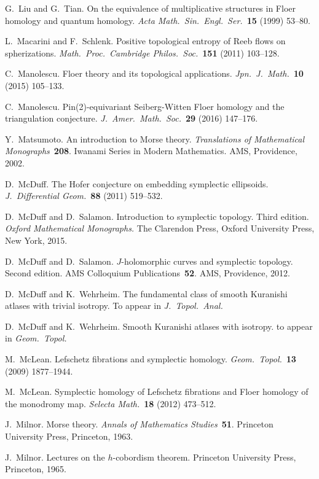 \documentclass[12pt,twoside]{amsart}
\theoremstyle{plain}
\numberwithin{figure}{section}
\numberwithin{equation}{section}
\begin{document}
\begin{thebibliography}{999}
G.\ Liu and G.\ Tian. 
On the equivalence of multiplicative structures in Floer homology and quantum homology. 
{\it Acta Math.\ Sin.\ Engl.\ Ser.}~{\bf 15} (1999) 53--80.

L.\ Macarini and F.\ Schlenk. 
Positive topological entropy of Reeb flows on spherizations. 
{\it Math.\ Proc.\ Cambridge Philos.\ Soc.}~{\bf 151} (2011) 103--128.

C.\ Manolescu.
Floer theory and its topological applications. 
{\it Jpn.\ J.\ Math.}~{\bf 10} (2015) 105--133.

C.\ Manolescu.
Pin(2)-equivariant Seiberg-Witten Floer homology and the triangulation conjecture. 
{\it J.\ Amer.\ Math.\ Soc.}~{\bf 29} (2016) 147--176. 


Y.\ Matsumoto.
An introduction to Morse theory. 
{\it Translations of Mathematical Monographs}~{\bf 208}. 
Iwanami Series in Modern Mathematics. AMS, Providence, 2002.


D.\ McDuff. 
The Hofer conjecture on embedding symplectic ellipsoids. 
{\it J.\ Differential Geom.}~{\bf 88} (2011) 519--532.

D.\ McDuff and D.\ Salamon.
Introduction to symplectic topology. 
Third edition. 
{\it Oxford Mathematical Monographs.} 
The Clarendon Press, Oxford University Press, New York, 2015. 


D.\ McDuff and D.\ Salamon.
$J$-holomorphic curves and symplectic topology. 
Second edition. AMS Colloquium Publications~{\bf 52}. 
AMS, Providence, 2012. 

D.\ McDuff and K.\ Wehrheim. 
The fundamental class of smooth Kuranishi atlases with trivial isotropy.
To appear in {\it J.\ Topol.\ Anal.}

D.\ McDuff and K.\ Wehrheim. 
Smooth Kuranishi atlases with isotropy.
to appear in {\it Geom.\ Topol.}

M.\ McLean.
Lefschetz fibrations and symplectic homology.
{\it Geom.\ Topol.}~{\bf 13} (2009) 1877--1944.

M.\ McLean.
Symplectic homology of Lefschetz fibrations and Floer homology of the monodromy map. 
{\it Selecta Math.}~{\bf 18} (2012) 473--512.

J.\ Milnor.
Morse theory. 
{\it Annals of Mathematics Studies}~{\bf 51}. 
Princeton University Press, Princeton, 1963.

J.\ Milnor.
Lectures on the $h$-cobordism theorem. 
Princeton University Press, Princeton, 1965.


\end{thebibliography}
\end{document}
